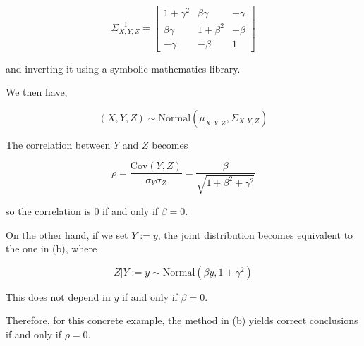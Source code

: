 \[ \Sigma_{X, Y, Z}^{-1} = \begin{bmatrix}
1 + \gamma^{2} & \beta \gamma & -\gamma \\
\beta \gamma & 1 + \beta^{2} & -\beta \\
-\gamma & -\beta & 1
\end{bmatrix} \]

and inverting it using a symbolic mathematics library.

We then have,

\[ (X, Y, Z) \sim \text{Normal}(\mu_{X, Y, Z}, \Sigma_{X, Y, Z}) \]

The correlation between \(Y\) and \(Z\) becomes

\[\rho = \frac{\text{Cov}(Y, Z)}{\sigma_Y \sigma_Z} = \frac{\beta}{\sqrt{1 + \beta^{2} + \gamma^{2}}}\]

so the correlation is 0 if and only if \(\beta = 0\).

On the other hand, if we set \(Y := y\), the joint distribution becomes
equivalent to the one in (b), where

\[ Z | Y := y \sim \text{Normal}\left( \beta y, 1 + \gamma^{2}\right) \]

This does not depend in \(y\) if and only if \(\beta = 0\).

Therefore, for this concrete example, the method in (b) yields correct
conclusions if and only if \(\rho = 0\).
